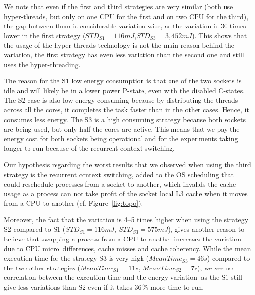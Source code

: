 We note that even if the first and third strategies are very similar (both use hyper-threads, but only on one CPU for the first and on two CPU for the third), the gap between them is considerable variation-wise, as the variation is 30 times lower in the first strategy ($STD_{S1}=116 mJ$,$STD_{S3}=3,452 mJ$).
This shows that the usage of the hyper-threads technology is not the main reason behind the variation, the first strategy has even less variation than the second one and still uses the hyper-threading.

The reason for the \textsf{S1} low energy consumption is that one of the two sockets is idle and will likely be in a lower power P-state, even with the disabled C-states.
The \textsf{S2} case is also low energy consuming because by distributing the threads across all the cores, it completes the task faster than in the other cases.
Hence, it consumes less energy.
The \textsf{S3} is a high consuming strategy because both sockets are being used, but only half the cores are active.
This means that we pay the energy cost for both sockets being operational and for the experiments taking longer to run because of the recurrent context switching.

Our hypothesis regarding the worst results that we observed when using the third strategy is the recurrent context switching, added to the OS scheduling that could reschedule processes from a socket to another, which invalids the cache usage as a process can not take profit of the socket local L3 cache when it moves from a CPU to another (cf. Figure~\ref{fig:topo}).

Moreover, the fact that the variation is 4--5 times higher when using the strategy \textsf{S2} compared to \textsf{S1} ($STD_{S1}=116 mJ$, $STD_{S3}=575 mJ$), gives another reason to believe that swapping a process from a CPU to another increases the variation due to CPU micro~differences, cache misses and cache coherency.
While the mean execution time for the strategy \textsf{S3} is very high ($MeanTime_{S3}= 46 s$) compared to the two other strategies ($MeanTime_{S1}= 11 s$, $MeanTime_{S2}= 7 s$), we see no correlation between the execution time and the energy variation, as the \textsf{S1} still give less variations than \textsf{S2} even if it takes 36\,\% more time to run.


